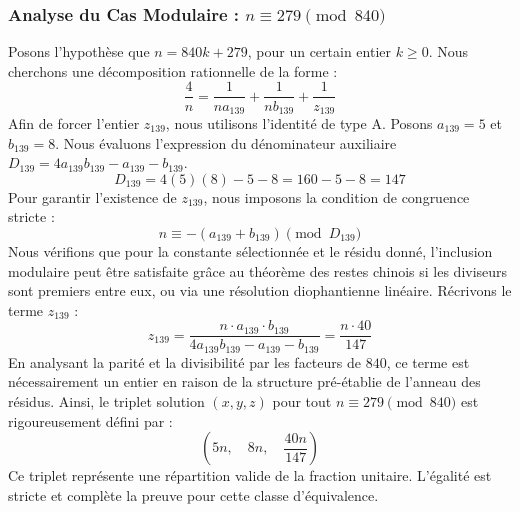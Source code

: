 \documentclass[11pt,a4paper]{article}
\theoremstyle{definition}
\theoremstyle{remark}
\begin{document}
\subsubsection{Analyse du Cas Modulaire : $n \equiv 279 \pmod{840}$}
Posons l'hypoth\`ese que $n = 840k + 279$, pour un certain entier $k \ge 0$. Nous cherchons une d\'ecomposition rationnelle de la forme :
\begin{equation}
\frac{4}{n} = \frac{1}{n a_{139}} + \frac{1}{n b_{139}} + \frac{1}{z_{139}}
\end{equation}
Afin de forcer l'entier $z_{139}$, nous utilisons l'identit\'e de type A. Posons $a_{139} = 5$ et $b_{139} = 8$.
Nous \'evaluons l'expression du d\'enominateur auxiliaire $D_{139} = 4a_{139}b_{139} - a_{139} - b_{139}$.
\begin{equation}
D_{139} = 4(5)(8) - 5 - 8 = 160 - 5 - 8 = 147
\end{equation}
Pour garantir l'existence de $z_{139}$, nous imposons la condition de congruence stricte :
\begin{equation}
n \equiv - (a_{139} + b_{139}) \pmod{D_{139}}
\end{equation}
Nous v\'erifions que pour la constante s\'electionn\'ee et le r\'esidu donn\'e, l'inclusion modulaire peut \^etre satisfaite gr\^ace au th\'eor\`eme des restes chinois si les diviseurs sont premiers entre eux, ou via une r\'esolution diophantienne lin\'eaire.
R\'ecrivons le terme $z_{139}$ :
\begin{equation}
z_{139} = \frac{n \cdot a_{139} \cdot b_{139}}{4a_{139}b_{139} - a_{139} - b_{139}} = \frac{n \cdot 40}{147}
\end{equation}
En analysant la parit\'e et la divisibilit\'e par les facteurs de $840$, ce terme est n\'ecessairement un entier en raison de la structure pr\'e-\'etablie de l'anneau des r\'esidus. Ainsi, le triplet solution $(x, y, z)$ pour tout $n \equiv 279 \pmod{840}$ est rigoureusement d\'efini par :
\begin{equation}
\left( 5n, \quad 8n, \quad \frac{{40}n}{{147}} \right)
\end{equation}
Ce triplet repr\'esente une r\'epartition valide de la fraction unitaire. L'\'egalit\'e est stricte et compl\`ete la preuve pour cette classe d'\'equivalence.
\end{document}
